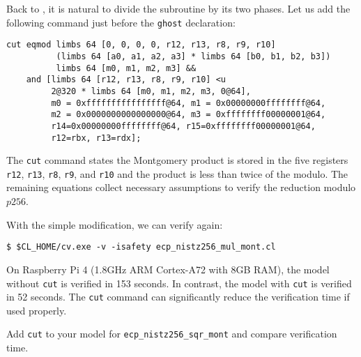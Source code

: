 \documentclass{amsproc}
\begin{document}
Back to \nistzmul, it is natural to divide the subroutine by its two
phases. Let us add the following command just before the
\texttt{ghost} declaration:
\begin{verbatim}
cut eqmod limbs 64 [0, 0, 0, 0, r12, r13, r8, r9, r10]
          (limbs 64 [a0, a1, a2, a3] * limbs 64 [b0, b1, b2, b3])
          limbs 64 [m0, m1, m2, m3] &&
    and [limbs 64 [r12, r13, r8, r9, r10] <u
         2@320 * limbs 64 [m0, m1, m2, m3, 0@64],
         m0 = 0xffffffffffffffff@64, m1 = 0x00000000ffffffff@64,
         m2 = 0x0000000000000000@64, m3 = 0xffffffff00000001@64,
         r14=0x00000000ffffffff@64, r15=0xffffffff00000001@64,
         r12=rbx, r13=rdx];
\end{verbatim}
The \texttt{cut} command states the Montgomery product is stored in
the five registers \texttt{r12}, \texttt{r13}, \texttt{r8},
\texttt{r9}, and \texttt{r10} and the product is less than twice of
the modulo. The remaining equations collect necessary assumptions to
verify the reduction modulo $p256$.

With the simple modification, we can verify \nistzmulcl again:
\begin{verbatim}
$ $CL_HOME/cv.exe -v -isafety ecp_nistz256_mul_mont.cl
\end{verbatim}
On Raspberry Pi 4 (1.8GHz ARM Cortex-A72 with 8GB RAM), the model
without \texttt{cut} is verified in 153 seconds. In contrast, the
model with \texttt{cut} is verified in 52 seconds. The \texttt{cut}
command can significantly reduce the verification time if used
properly.

\exercise Add \texttt{cut} to your model for
\texttt{ecp\_nistz256\_sqr\_mont} and compare verification time.
\end{document}
